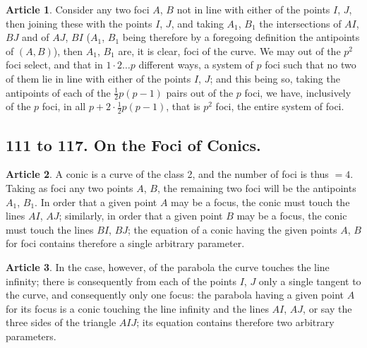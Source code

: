 \documentclass[11pt,a4paper]{article}
\theoremstyle{definition}
\newtheorem{art}{Article}
\begin{document}
\begin{art}
Consider any two foci $A$, $B$ not in line with either of the points $I$, $J$, then joining these with the points $I$, $J$, and taking $A_{1}$, $B_{1}$ the intersections of $AI$, $BJ$ and of $AJ$, $BI$ ($A_{1}$, $B_{1}$ being therefore by a foregoing definition the antipoints of $(A, B)$), then $A_{1}$, $B_{1}$ are, it is clear, foci of the curve. We may out of the $p^{2}$ foci select, and that in $1 \cdot 2 \ldots p$ different ways, a system of $p$ foci such that no two of them lie in line with either of the points $I$, $J$; and this being so, taking the antipoints of each of the $\tfrac{1}{2}p(p - 1)$ pairs out of the $p$ foci, we have, inclusively of the $p$ foci, in all $p + 2 \cdot \tfrac{1}{2}p(p - 1)$, that is $p^{2}$ foci, the entire system of foci.
\end{art}

\subsection*{111 to 117. On the Foci of Conics.}

\begin{art}
A conic is a curve of the class 2, and the number of foci is thus $= 4$. Taking as foci any two points $A$, $B$, the remaining two foci will be the antipoints $A_{1}$, $B_{1}$. In order that a given point $A$ may be a focus, the conic must touch the lines $AI$, $AJ$; similarly, in order that a given point $B$ may be a focus, the conic must touch the lines $BI$, $BJ$; the equation of a conic having the given points $A$, $B$ for foci contains therefore a single arbitrary parameter.
\end{art}

\begin{art}
In the case, however, of the parabola the curve touches the line infinity; there is consequently from each of the points $I$, $J$ only a single tangent to the curve, and consequently only one focus: the parabola having a given point $A$ for its focus is a conic touching the line infinity and the lines $AI$, $AJ$, or say the three sides of the triangle $AIJ$; its equation contains therefore two arbitrary parameters.
\end{art}
\end{document}
